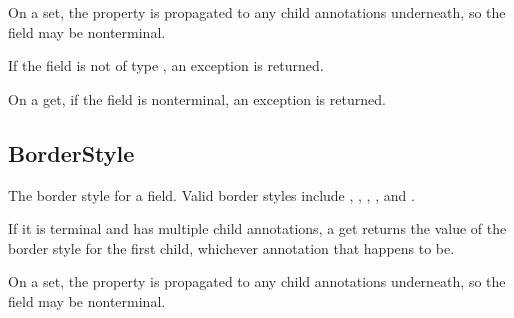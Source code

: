 \documentclass[letterpaper,12pt,english,openany,oneside]{sphinxmanual}
\begin{document}
On a set, the property is propagated to any child annotations underneath, so the field may be non\sphinxhyphen{}terminal.

\label{\detokenize{IAC_API_FormsIntro:exceptions-5}}

If the field is not of type , an exception  is returned.

On a get, if the field is non\sphinxhyphen{}terminal, an exception  is returned.

\label{\detokenize{IAC_API_FormsIntro:example-6}}

\begin{sphinxVerbatim}[commandchars=\\\{\}]
  
\end{sphinxVerbatim}




\subsection{BorderStyle}
\label{\detokenize{IAC_API_FormsIntro:borderstyle}}
The border style for a field. Valid border styles include , , , , and .

\label{\detokenize{IAC_API_FormsIntro:syntax-11}}

\begin{sphinxVerbatim}[commandchars=\\\{\}]
\PYG{p}{[}\PYG{p}{]} 
\end{sphinxVerbatim}
\label{\detokenize{IAC_API_FormsIntro:returns-1}}

If it is terminal and has multiple child annotations, a get returns the value of the border style for the first child, whichever annotation that happens to be.

On a set, the property is propagated to any child annotations underneath, so the field may be non\sphinxhyphen{}terminal.

\label{\detokenize{IAC_API_FormsIntro:exceptions-6}}
\end{document}
